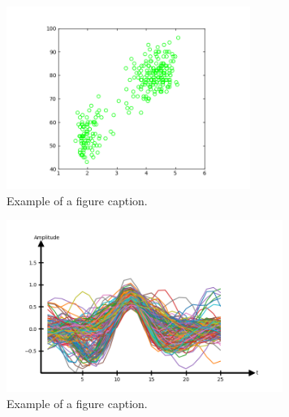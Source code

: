 \documentclass[conference]{IEEEtran}
\begin{document}
\begin{figure}[p!]
\centerline{\includegraphics[trim=70 0 70 0, clip, width=300]{Figure_7.png}}
\caption{Example of a figure caption.}
\label{fig:oldfaithful}
\end{figure}

\begin{figure}[p!]
\centerline{\includegraphics[trim=20 0 40 0, clip, width=340]{Figure_8.png}}
\caption{Example of a figure caption.}
\label{fig:neuralspikes}
\end{figure}
\end{document}
